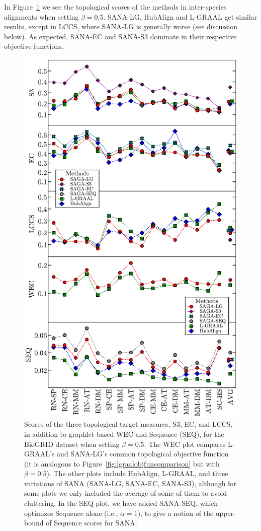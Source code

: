 \documentclass{bioinfo}
\begin{document}
In Figure~\ref{fig:biogrid_beta0,5} we see the topological scores of the methods in inter-species alignments when setting $\beta=0.5$. SANA-LG, HubAlign and L-GRAAL get similar results, except in LCCS, where SANA-LG is generally worse (see discussion below). As expected, SANA-EC and SANA-S3 dominate in their respective objective functions.

\begin{figure}
\centering
\includegraphics[width=0.99\linewidth]{biogrid_beta05_bw.eps}
\caption{Scores of the three topological target measures, S3, EC, and LCCS, in addition to graphlet-based WEC and Sequence (SEQ), for the BioGRID dataset when setting $\beta=0.5$. The WEC plot compares L-GRAAL's and SANA-LG's common topological objective function (it is analogous to Figure~\ref{fig:lgraalobjfuncomparison} but with $\beta=0.5$). The other plots include HubAlign, L-GRAAL, and three variations of SANA (SANA-LG, SANA-EC, SANA-S3), although for some plots we only included the average of some of them to avoid cluttering. In the SEQ plot, we have added SANA-SEQ, which optimizes Sequence alone (i.e., $\alpha=1$), to give a notion of the upper-bound of Sequence scores for SANA.}
\label{fig:biogrid_beta0,5}
\end{figure}
\end{document}
